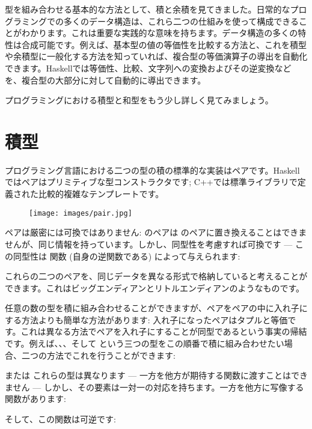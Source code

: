 
\lettrine[lhang=0.17]{型}{を}組み合わせる基本的な方法として、積と余積を見てきました。日常的なプログラミングでの多くのデータ構造は、これら二つの仕組みを使って構成できることがわかります。これは重要な実践的な意味を持ちます。データ構造の多くの特性は合成可能です。例えば、基本型の値の等価性を比較する方法と、これを積型や余積型に一般化する方法を知っていれば、複合型の等価演算子の導出を自動化できます。Haskellでは等価性、比較、文字列への変換およびその逆変換などを、複合型の大部分に対して自動的に導出できます。

プログラミングにおける積型と和型をもう少し詳しく見てみましょう。

\section{積型}

プログラミング言語における二つの型の積の標準的な実装はペアです。Haskellではペアはプリミティブな型コンストラクタです; C++では標準ライブラリで定義された比較的複雑なテンプレートです。

\begin{figure}[H]
  \centering
  \texttt{[image: images/pair.jpg]}
\end{figure}

\noindent
ペアは厳密には可換ではありません:   のペアは  のペアに置き換えることはできませんが、同じ情報を持っています。しかし、同型性を考慮すれば可換です --- この同型性は  関数 (自身の逆関数である) によって与えられます: 

これらの二つのペアを、同じデータを異なる形式で格納していると考えることができます。これはビッグエンディアンとリトルエンディアンのようなものです。

任意の数の型を積に組み合わせることができますが、ペアをペアの中に入れ子にする方法よりも簡単な方法があります: 入れ子になったペアはタプルと等価です。これは異なる方法でペアを入れ子にすることが同型であるという事実の帰結です。例えば、、、そして という三つの型をこの順番で積に組み合わせたい場合、二つの方法でこれを行うことができます: 


または
これらの型は異なります --- 一方を他方が期待する関数に渡すことはできません --- しかし、その要素は一対一の対応を持ちます。一方を他方に写像する関数があります: 

そして、この関数は可逆です: 

